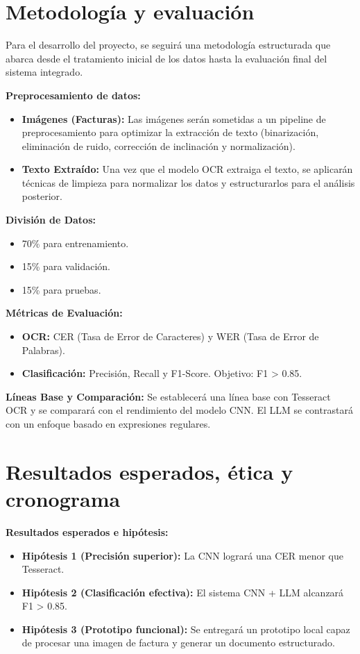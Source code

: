 \documentclass[11pt,letterpaper]{article}
\begin{document}
	\section{Metodología y evaluación}
	Para el desarrollo del proyecto, se seguirá una metodología estructurada que abarca desde el tratamiento inicial de los datos hasta la evaluación final del sistema integrado.
	
	\textbf{Preprocesamiento de datos:}
	\begin{itemize}
		\item \textbf{Imágenes (Facturas):} Las imágenes serán sometidas a un pipeline de preprocesamiento para optimizar la extracción de texto (binarización, eliminación de ruido, corrección de inclinación y normalización).
		\item \textbf{Texto Extraído:} Una vez que el modelo OCR extraiga el texto, se aplicarán técnicas de limpieza para normalizar los datos y estructurarlos para el análisis posterior.
	\end{itemize}
	
	\textbf{División de Datos:}
	\begin{itemize}
		\item 70\% para entrenamiento.
		\item 15\% para validación.
		\item 15\% para pruebas.
	\end{itemize}
	
	\textbf{Métricas de Evaluación:}
	\begin{itemize}
		\item \textbf{OCR:} CER (Tasa de Error de Caracteres) y WER (Tasa de Error de Palabras).
		\item \textbf{Clasificación:} Precisión, Recall y F1-Score. Objetivo: F1 > 0.85.
	\end{itemize}
	
	\textbf{Líneas Base y Comparación:} Se establecerá una línea base con Tesseract OCR y se comparará con el rendimiento del modelo CNN. El LLM se contrastará con un enfoque basado en expresiones regulares.
	
	\section{Resultados esperados, ética y cronograma}
	
	\textbf{Resultados esperados e hipótesis:}
	\begin{itemize}
		\item \textbf{Hipótesis 1 (Precisión superior):} La CNN logrará una CER menor que Tesseract.
		\item \textbf{Hipótesis 2 (Clasificación efectiva):} El sistema CNN + LLM alcanzará F1 > 0.85.
		\item \textbf{Hipótesis 3 (Prototipo funcional):} Se entregará un prototipo local capaz de procesar una imagen de factura y generar un documento estructurado.
	\end{itemize}
	
\end{document}

